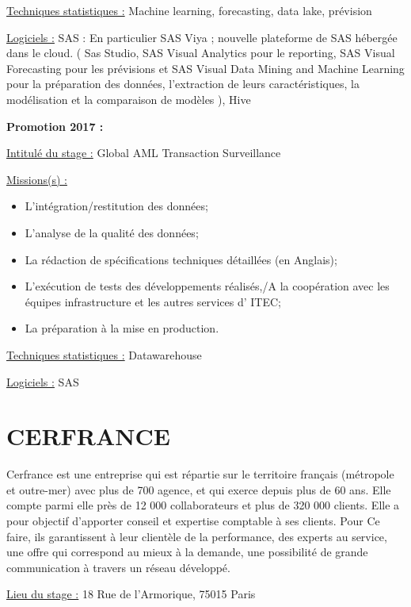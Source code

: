 \documentclass[
  letterpaper,
  DIV=11,
  numbers=noendperiod]{scrreprt}
\begin{document}
\uline{Techniques statistiques :} Machine learning, forecasting, data
lake, prévision

\uline{Logiciels :} SAS : En particulier SAS Viya ; nouvelle plateforme
de SAS hébergée dans le cloud. ( Sas Studio, SAS Visual Analytics pour
le reporting, SAS Visual Forecasting pour les prévisions et SAS Visual
Data Mining and Machine Learning pour la préparation des données,
l'extraction de leurs caractéristiques, la modélisation et la
comparaison de modèles ), Hive

\textbf{Promotion 2017 :}

\uline{Intitulé du stage :} Global AML Transaction Surveillance

\uline{Missions(s) :}

\begin{itemize}
\item
  L'intégration/restitution des données;
\item
  L'analyse de la qualité des données;
\item
  La rédaction de spécifications techniques détaillées (en Anglais);
\item
  L'exécution de tests des développements réalisés,/A la coopération
  avec les équipes infrastructure et les autres services d' ITEC;
\item
  La préparation à la mise en production.
\end{itemize}

\uline{Techniques statistiques :} Datawarehouse

\uline{Logiciels :} SAS

\hypertarget{cerfrance}{%
\section{\texorpdfstring{\textbf{CERFRANCE}}{CERFRANCE}}\label{cerfrance}}

Cerfrance est une entreprise qui est répartie sur le territoire français
(métropole et outre-mer) avec plus de 700 agence, et qui exerce depuis
plus de 60 ans. Elle compte parmi elle près de 12 000 collaborateurs et
plus de 320 000 clients. Elle a pour objectif d'apporter conseil et
expertise comptable à ses clients. Pour Ce faire, ils garantissent à
leur clientèle de la performance, des experts au service, une offre qui
correspond au mieux à la demande, une possibilité de grande
communication à travers un réseau développé.

\uline{Lieu du stage :} 18 Rue de l'Armorique, 75015 Paris
\end{document}
